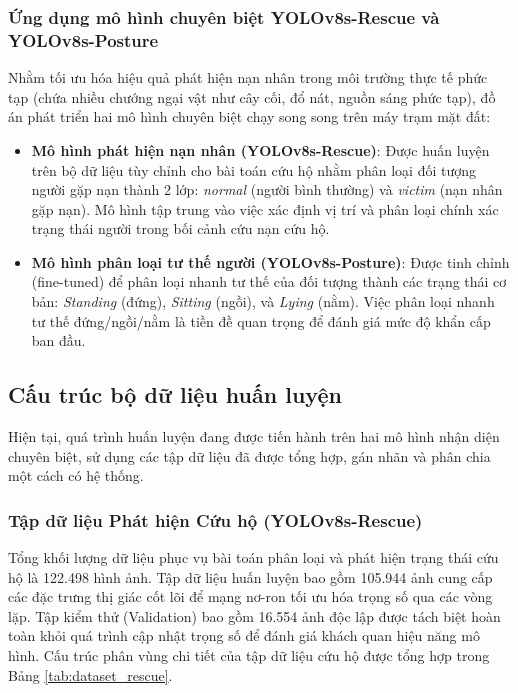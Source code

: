 \subsubsection{Ứng dụng mô hình chuyên biệt YOLOv8s-Rescue và YOLOv8s-Posture}

Nhằm tối ưu hóa hiệu quả phát hiện nạn nhân trong môi trường thực tế phức tạp (chứa nhiều chướng ngại vật như cây cối, đổ nát, nguồn sáng phức tạp), đồ án phát triển hai mô hình chuyên biệt chạy song song trên máy trạm mặt đất:

\begin{itemize}
    \item \textbf{Mô hình phát hiện nạn nhân (YOLOv8s-Rescue)}: Được huấn luyện trên bộ dữ liệu tùy chỉnh cho bài toán cứu hộ nhằm phân loại đối tượng người gặp nạn thành 2 lớp: \textit{normal} (người bình thường) và \textit{victim} (nạn nhân gặp nạn). Mô hình tập trung vào việc xác định vị trí và phân loại chính xác trạng thái người trong bối cảnh cứu nạn cứu hộ.
    \item \textbf{Mô hình phân loại tư thế người (YOLOv8s-Posture)}: Được tinh chỉnh (fine-tuned) để phân loại nhanh tư thế của đối tượng thành các trạng thái cơ bản: \textit{Standing} (đứng), \textit{Sitting} (ngồi), và \textit{Lying} (nằm). Việc phân loại nhanh tư thế đứng/ngồi/nằm là tiền đề quan trọng để đánh giá mức độ khẩn cấp ban đầu.
\end{itemize}

\subsection{Cấu trúc bộ dữ liệu huấn luyện}

Hiện tại, quá trình huấn luyện đang được tiến hành trên hai mô hình nhận diện chuyên biệt, sử dụng các tập dữ liệu đã được tổng hợp, gán nhãn và phân chia một cách có hệ thống.

\subsubsection{Tập dữ liệu Phát hiện Cứu hộ (YOLOv8s-Rescue)}

Tổng khối lượng dữ liệu phục vụ bài toán phân loại và phát hiện trạng thái cứu hộ là 122.498 hình ảnh. Tập dữ liệu huấn luyện bao gồm 105.944 ảnh cung cấp các đặc trưng thị giác cốt lõi để mạng nơ-ron tối ưu hóa trọng số qua các vòng lặp. Tập kiểm thử (Validation) bao gồm 16.554 ảnh độc lập được tách biệt hoàn toàn khỏi quá trình cập nhật trọng số để đánh giá khách quan hiệu năng mô hình. Cấu trúc phân vùng chi tiết của tập dữ liệu cứu hộ được tổng hợp trong Bảng \ref{tab:dataset_rescue}.

